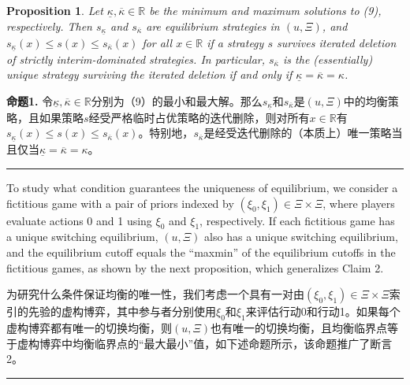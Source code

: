 \documentclass[12pt,a4paper]{article}
\newenvironment{original}
  {\par\medskip\noindent\color{black}\ignorespaces}
  {\par\medskip}
\newenvironment{translation}
  {\par\noindent\color{darkblue}\ignorespaces}
  {\par\medskip\noindent\hrule\par\medskip}
\newtheorem{proposition}[theorem]{Proposition}
\theoremstyle{definition}
\theoremstyle{remark}
\begin{document}
\begin{proposition}
Let $\underline{\kappa}, \overline{\kappa} \in \mathbb{R}$ be the minimum and maximum solutions to (9), respectively. Then $s_{\underline{\kappa}}$ and $s_{\overline{\kappa}}$ are equilibrium strategies in $(u, \Xi)$, and $s_{\underline{\kappa}}(x) \le s(x) \le s_{\overline{\kappa}}(x)$ for all $x \in \mathbb{R}$ if a strategy $s$ survives iterated deletion of strictly interim-dominated strategies. In particular, $s_{\overline{\kappa}}$ is the (essentially) unique strategy surviving the iterated deletion if and only if $\underline{\kappa} = \overline{\kappa} = \kappa$.
\end{proposition}
\begin{translation}
\color{darkblue}\textbf{命题1.} 令$\underline{\kappa}, \overline{\kappa} \in \mathbb{R}$分别为（9）的最小和最大解。那么$s_{\underline{\kappa}}$和$s_{\overline{\kappa}}$是$(u, \Xi)$中的均衡策略，且如果策略$s$经受严格临时占优策略的迭代删除，则对所有$x \in \mathbb{R}$有$s_{\underline{\kappa}}(x) \le s(x) \le s_{\overline{\kappa}}(x)$。特别地，$s_{\overline{\kappa}}$是经受迭代删除的（本质上）唯一策略当且仅当$\underline{\kappa} = \overline{\kappa} = \kappa$。
\end{translation}

\begin{original}
To study what condition guarantees the uniqueness of equilibrium, we consider a fictitious game with a pair of priors indexed by $(\xi_0, \xi_1) \in \Xi \times \Xi$, where players evaluate actions 0 and 1 using $\xi_0$ and $\xi_1$, respectively. If each fictitious game has a unique switching equilibrium, $(u, \Xi)$ also has a unique switching equilibrium, and the equilibrium cutoff equals the ``maxmin'' of the equilibrium cutoffs in the fictitious games, as shown by the next proposition, which generalizes Claim 2.
\end{original}
\begin{translation}
为研究什么条件保证均衡的唯一性，我们考虑一个具有一对由$(\xi_0, \xi_1) \in \Xi \times \Xi$索引的先验的虚构博弈，其中参与者分别使用$\xi_0$和$\xi_1$来评估行动0和行动1。如果每个虚构博弈都有唯一的切换均衡，则$(u, \Xi)$也有唯一的切换均衡，且均衡临界点等于虚构博弈中均衡临界点的``最大最小''值，如下述命题所示，该命题推广了断言2。
\end{translation}
\end{document}
